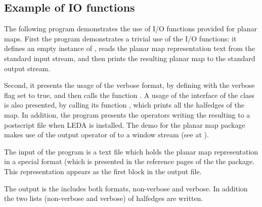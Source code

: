 \subsection{Example of IO functions}
\label{PM_sec:example9}

The following program demonstrates the use of I/O functions provided
for planar maps. 
First the program demonstrates a trivial use of the I/O functions: 
it defines an empty instance of , 
reads the planar map representation text from the standard input stream, 
and then prints the resulting planar map to the standard output stream.

Second, it presents the usage of the verbose format, 
by defining  with the verbose flag set to true, 
and then calls the function .
A usage of the interface of the class  is also
presented, by calling its function , which
prints all the halfedges of the map. In addition, the program presents
the operators writing the resulting   to a postscript
file when LEDA is installed. The demo for the planar map package makes
use of the output operator of  to a
window stream  (see at  ).   



The input of the program is a text file which holds the planar map
representation in a special format (which is presented in the
reference pages of the the  package.
This representation appears as the first block in the output file.
 

The output is the  includes both formats, non-verbose
and verbose. In addition the two lists (non-verbose and verbose) of
halfedges are written.

